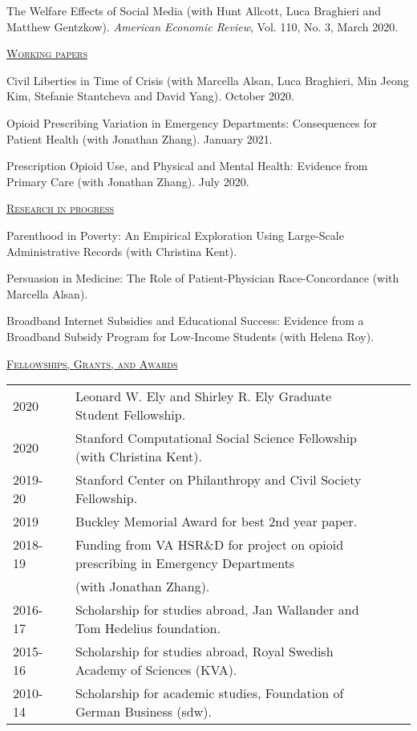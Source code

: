 \documentclass[letterpaper,11pt]{article}
\begin{document}
The Welfare Effects of Social Media (with Hunt Allcott, Luca Braghieri and Matthew Gentzkow). \textit{American Economic Review}, Vol. 110, No. 3, March 2020.

\medskip

\underline {\textsc{Working papers}}

Civil Liberties in Time of Crisis (with Marcella Alsan, Luca Braghieri, Min Jeong Kim, Stefanie Stantcheva and David Yang). October 2020.

Opioid Prescribing Variation in Emergency Departments: Consequences for Patient Health (with Jonathan Zhang). January 2021.

Prescription Opioid Use, and Physical and Mental Health: Evidence from Primary Care (with Jonathan Zhang). July 2020.


\medskip


\underline {\textsc{Research in progress}}

Parenthood in Poverty: An Empirical Exploration Using Large-Scale Administrative Records (with Christina Kent).

Persuasion in Medicine: The Role of Patient-Physician Race-Concordance (with Marcella Alsan).

Broadband Internet Subsidies and Educational Success: Evidence from a Broadband Subsidy Program for Low-Income Students (with Helena Roy).

 
 \medskip


\underline {\textsc{Fellowships, Grants, and Awards}}

\begin{tabular}{@{}l@{}cl@{}cl}
2020 & & Leonard W. Ely and Shirley R. Ely Graduate Student Fellowship. \\
2020 & & Stanford Computational Social Science Fellowship (with Christina Kent). \\
2019-20 & & Stanford Center on Philanthropy and Civil Society Fellowship. \\
2019 & & Buckley Memorial Award for best 2nd year paper. \\
2018-19 & & Funding from VA HSR\&D for project on opioid prescribing in Emergency Departments \\ & & (with Jonathan Zhang). \\
2016-17 & & Scholarship for studies abroad, Jan Wallander and Tom Hedelius foundation. \\
2015-16 & & Scholarship for studies abroad, Royal Swedish Academy of Sciences (KVA).  \\
2010-14 & & Scholarship for academic studies, Foundation of German Business (sdw).
\end{tabular}
 
\end{document}
